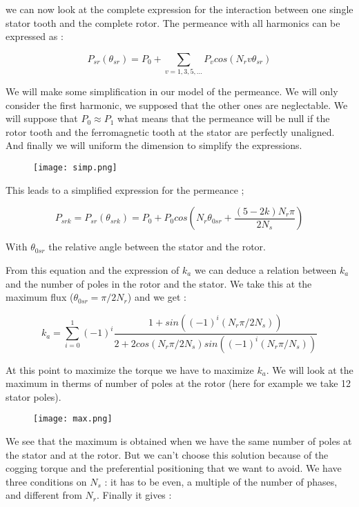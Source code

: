  we can now look at the complete expression for the interaction between one single stator tooth and the complete rotor. The permeance with all harmonics can be expressed as : 
 
 $$ P_{sr}(\theta_{sr}) = P_{0} + \sum_{v=1,3,5,...} P_{v}cos(N_{r}v\theta_{sr})$$
 
 We will make some simplification in our model of the permeance. We will only consider the first harmonic, we supposed that the other ones are neglectable. We will suppose that $P_{0} \approx P_{1}$ what means that the permeance will be null if the rotor tooth and the ferromagnetic tooth at the stator are perfectly unaligned. And finally we will uniform the dimension to simplify the expressions.
 
  \begin{figure}[H]
    \centering
    \texttt{[image: simp.png]}
    \caption{}
\end{figure}
 
 This leads to a simplified expression for the permeance ; 
 
 $$ P_{srk} = P_{sr}(\theta_{srk}) = P_{0} + P_{0} cos(N_{r}\theta_{0sr} + \frac{(5-2k)N_{r}\pi}{2N_{s}})$$
 
 With $\theta_{0sr}$ the relative angle between the stator and the rotor. 
 
 From this equation and the expression of $k_{a}$ we can deduce a relation between $k_{a}$ and the number of poles in the rotor and the stator. We take this at the maximum flux ($\theta_{0sr} = \pi / 2N_{r}$) and we get : 
 
 $$ k_{a} = \sum_{i=0}^{1} (-1)^{i} \frac{1+sin((-1)^{i}(N_{r}\pi/2N_{s}))}{2 + 2cos(N_{r}\pi/2N_{s})sin((-1)^{i}(N_{r}\pi/N_{s}))} $$
 
 At this point to maximize the torque we have to maximize $k_{a}$. We will look at the maximum in therms of number of poles at the rotor (here for example we take 12 stator poles). 
 
   \begin{figure}[H]
    \centering
    \texttt{[image: max.png]}
    \caption{}
\end{figure}
 
 We see that the maximum is obtained when we have the same number of poles at the stator and at the rotor. But we can't choose this solution because of the cogging torque and the preferential positioning that we want to avoid. We have three conditions on $N_{s}$ : it has to be even, a multiple of the number of phases, and different from $N_{r}$. Finally it gives : 
 
